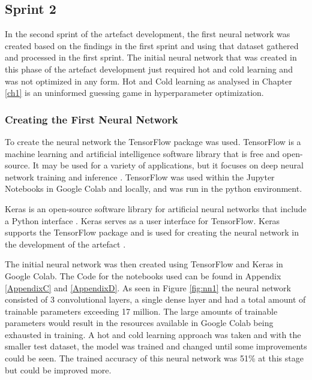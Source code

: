 \subsection{Sprint 2}
 
In the second sprint of the artefact development, the first neural network was created based on the findings in the first sprint and using that dataset gathered and processed in the first sprint. The initial neural network that was created in this phase of the artefact development just required hot and cold learning and was not optimized in any form. Hot and Cold learning as analysed in Chapter \ref{ch1} is an uninformed guessing game in hyperparameter optimization.

\subsubsection{Creating the First Neural Network}

To create the neural network the TensorFlow package was used. TensorFlow is a machine learning and artificial intelligence software library that is free and open-source. It may be used for a variety of applications, but it focuses on deep neural network training and inference \citep{tensor2016}. TensorFlow was used within the Jupyter Notebooks in Google Colab and locally, and was run in the python environment.

 Keras is an open-source software library for artificial neural networks that include a Python interface \citep{kerascnn2017}. Keras serves as a user interface for TensorFlow. Keras supports the TensorFlow package and is used for creating the neural network in the development of the artefact \citep{kerascnn2017}.
 
The initial neural network was then created using TensorFlow and Keras in Google Colab. The Code for the notebooks used can be found in Appendix \ref{AppendixC} and \ref{AppendixD}. As seen in Figure \ref{fig:nn1} the neural network consisted of 3 convolutional layers, a single dense layer and had a total amount of trainable parameters exceeding 17 million. The large amounts of trainable parameters would result in the resources available in Google Colab being exhausted in training. A hot and cold learning approach was taken and with the smaller test dataset, the model was trained and changed until some improvements could be seen. The trained accuracy of this neural network was 51\% at this stage but could be improved more. 

